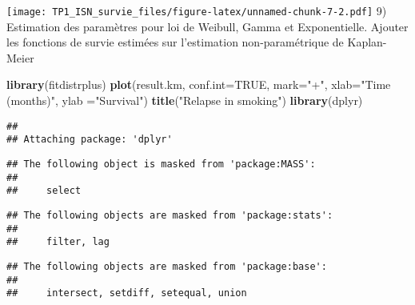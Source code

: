 \documentclass[
]{article}
\newenvironment{Shaded}{\begin{snugshade}}{\end{snugshade}}
\newcommand{\DataTypeTok}[1]{\textcolor[rgb]{0.13,0.29,0.53}{#1}}
\newcommand{\KeywordTok}[1]{\textcolor[rgb]{0.13,0.29,0.53}{\textbf{#1}}}
\newcommand{\NormalTok}[1]{#1}
\newcommand{\OtherTok}[1]{\textcolor[rgb]{0.56,0.35,0.01}{#1}}
\newcommand{\StringTok}[1]{\textcolor[rgb]{0.31,0.60,0.02}{#1}}
\begin{document}
\texttt{[image: TP1\_ISN\_survie\_files/figure-latex/unnamed-chunk-7-2.pdf]}
9) Estimation des paramètres pour loi de Weibull, Gamma et
Exponentielle. Ajouter les fonctions de survie estimées sur l'estimation
non-paramétrique de Kaplan-Meier

\begin{Shaded}
\begin{Highlighting}[]
\KeywordTok{library}\NormalTok{(fitdistrplus)}
\KeywordTok{plot}\NormalTok{(result.km, }\DataTypeTok{conf.int=}\OtherTok{TRUE}\NormalTok{, }\DataTypeTok{mark=}\StringTok{"+"}\NormalTok{, }\DataTypeTok{xlab=}\StringTok{"Time (months)"}\NormalTok{, }\DataTypeTok{ylab =}\StringTok{"Survival"}\NormalTok{)}
\KeywordTok{title}\NormalTok{(}\StringTok{"Relapse in smoking"}\NormalTok{)}
\KeywordTok{library}\NormalTok{(dplyr)}
\end{Highlighting}
\end{Shaded}

\begin{verbatim}
## 
## Attaching package: 'dplyr'
\end{verbatim}

\begin{verbatim}
## The following object is masked from 'package:MASS':
## 
##     select
\end{verbatim}

\begin{verbatim}
## The following objects are masked from 'package:stats':
## 
##     filter, lag
\end{verbatim}

\begin{verbatim}
## The following objects are masked from 'package:base':
## 
##     intersect, setdiff, setequal, union
\end{verbatim}
\end{document}
